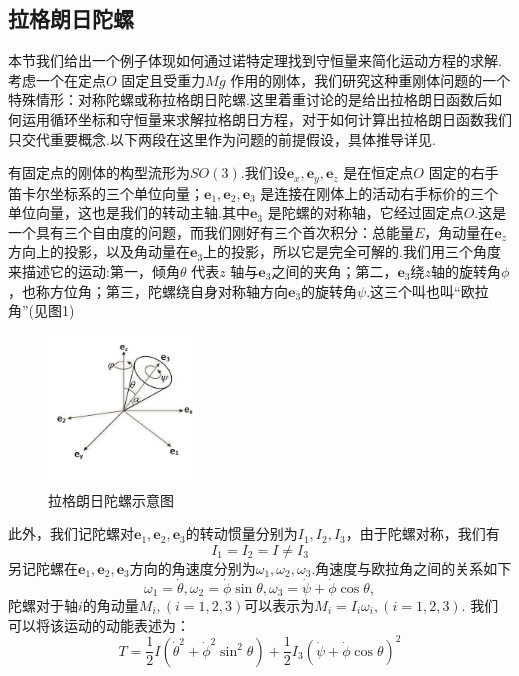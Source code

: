 \documentclass[UTF8,10.5pt,a4paper]{ctexart}
\numberwithin{equation}{section}
\theoremstyle{definition}
\theoremstyle{definition}
\begin{document}
\subsection{拉格朗日陀螺}
本节我们给出一个例子体现如何通过诺特定理找到守恒量来简化运动方程的求解.考虑一个在定点$O$ 固定且受重力$Mg$ 作用的刚体，我们研究这种重刚体问题的一个特殊情形：对称陀螺或称拉格朗日陀螺.这里着重讨论的是给出拉格朗日函数后如何运用循环坐标和守恒量来求解拉格朗日方程，对于如何计算出拉格朗日函数我们只交代重要概念.以下两段在这里作为问题的前提假设，具体推导详见\cite{AI3}.
\par 有固定点的刚体的构型流形为$SO(3)$.我们设$\textbf{e}_x,\textbf{e}_y,\textbf{e}_z$ 是在恒定点$O$ 固定的右手笛卡尔坐标系的三个单位向量；$\textbf{e}_1,\textbf{e}_2,\textbf{e}_3$ 是连接在刚体上的活动右手标价的三个单位向量，这也是我们的转动主轴.其中$\textbf{e}_3$ 是陀螺的对称轴，它经过固定点$O$.这是一个具有三个自由度的问题，而我们刚好有三个首次积分：总能量$E$，角动量在$\textbf{e}_z$方向上的投影，以及角动量在$\textbf{e}_3$上的投影，所以它是完全可解的.我们用三个角度来描述它的运动:第一，倾角$\theta$ 代表$z$ 轴与$\textbf{e}_3$之间的夹角；第二，$\textbf{e}_3$绕$z$轴的旋转角$\phi$，也称方位角；第三，陀螺绕自身对称轴方向$\textbf{e}_3$的旋转角$\psi$.这三个叫也叫“欧拉角”(见图1)
 \begin{figure}[h]                       %
 \renewcommand{\captionfont}{\small}     %
 \centering
 \includegraphics[height=4cm]{tuoluo1.jpg}
 \caption{拉格朗日陀螺示意图}
\end{figure}
\par 此外，我们记陀螺对$\textbf{e}_1,\textbf{e}_2,\textbf{e}_3$的转动惯量分别为$I_1,I_2,I_3$，由于陀螺对称，我们有
$$I_1=I_2=I\neq I_3 $$
另记陀螺在$\textbf{e}_1,\textbf{e}_2,\textbf{e}_3$方向的角速度分别为$\omega_1,\omega_2,\omega_3$.角速度与欧拉角之间的关系如下
$$\omega_1=\dot{\theta},\omega_2=\dot{\phi}\sin \theta,\omega_3=\dot{\psi} + \dot{\phi}\cos \theta ,$$
陀螺对于轴$i$的角动量$M_i,(i=1,2,3)$可以表示为$M_i=I_i\omega_i,(i=1,2,3)$.
我们可以将该运动的动能表述为：
 $$T= \frac{1}{2}I(\dot{\theta}^{2} + \dot{\phi}^{2}\sin^{2}\theta) + \frac{1}{2}I_{3}\left( \dot{\psi} + \dot{\phi}\cos \theta\right)^{2}$$
\end{document}
